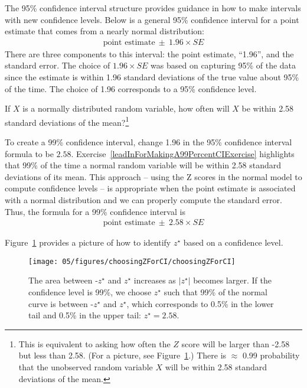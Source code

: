 The 95\% confidence interval structure provides guidance in how to make intervals with new confidence levels. Below is a general 95\% confidence interval for a point estimate that comes from a nearly normal distribution:
\begin{eqnarray}
\text{point estimate}\ \pm\ 1.96\times SE
\end{eqnarray}
There are three components to this interval: the point estimate, ``1.96'', and the standard error. The choice of $1.96\times SE$ was based on capturing 95\% of the data since the estimate is within 1.96 standard deviations of the true value about 95\% of the time. The choice of 1.96 corresponds to a 95\% confidence level. 

\begin{exercise} \label{leadInForMakingA99PercentCIExercise}
If $X$ is a normally distributed random variable, how often will $X$ be within 2.58 standard deviations of the mean?\footnote{This is equivalent to asking how often the $Z$ score will be larger than -2.58 but less than 2.58. (For a picture, see Figure~\ref{choosingZForCI}.) There is $\approx$ 0.99 probability that the unobserved random variable $X$ will be within 2.58 standard deviations of the mean.}
\end{exercise}

To create a 99\% confidence interval, change 1.96 in the 95\% confidence interval formula to be $2.58$. Exercise~\ref{leadInForMakingA99PercentCIExercise} highlights that 99\% of the time a normal random variable will be within 2.58 standard deviations of its mean. This approach -- using the Z scores in the normal model to compute confidence levels -- is appropriate when the point estimate is associated with a normal distribution and we can properly compute the standard error. Thus, the formula for a 99\% confidence interval is
\begin{eqnarray}
\text{point estimate}\ \pm\ 2.58\times SE
\label{99PercCIForMean}
\label{99PercCIForNormalPointEstimate}
\end{eqnarray}

Figure~\ref{choosingZForCI} provides a picture of how to identify $z^{\star}$ based on a confidence level. 

\begin{figure}[ht]
\centering
\texttt{[image: 05/figures/choosingZForCI/choosingZForCI]}
\caption{The area between -$z^{\star}$ and $z^{\star}$ increases as $|z^{\star}|$ becomes larger. If the confidence level is 99\%, we choose $z^{\star}$ such that 99\% of the normal curve is between -$z^{\star}$ and $z^{\star}$, which corresponds to 0.5\% in the lower tail and 0.5\% in the upper tail: $z^{\star}=2.58$.}
\label{choosingZForCI}
\end{figure}

